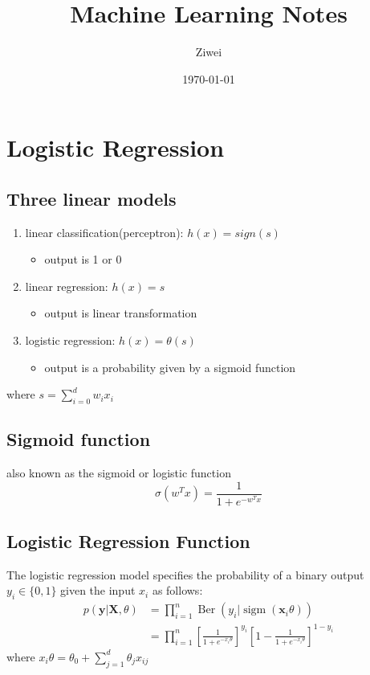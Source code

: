 \documentclass[11pt]{article}
\author{Ziwei}
\date{\today}
\title{Machine Learning Notes}
\begin{document}
\maketitle
\tableofcontents


\section{Logistic Regression}
\label{sec:org920332c}
\subsection{Three linear models}
\label{sec:org347594c}
\begin{enumerate}
\item linear classification(perceptron): \(h(x)=sign(s)\) 
\begin{itemize}
\item output is 1 or 0
\end{itemize}
\item linear regression: \(h(x)=s\) 
\begin{itemize}
\item output is linear transformation
\end{itemize}
\item logistic regression: \(h(x)= \theta(s)\)
\begin{itemize}
\item output is a probability given by a sigmoid function
\end{itemize}
\end{enumerate}
where \(s=\sum_{i=0}^{d}w_{i}x_{i}\) 

\subsection{Sigmoid function}
\label{sec:org3689c99}
also known as the sigmoid or logistic function 
$$
\sigma(w^Tx) = \frac{1}{1+e^{-w^T x}} 
$$

\subsection{Logistic Regression Function}
\label{sec:org81d0854}
The logistic regression model specifies the probability of a binary output \(y_i \in \{0,1\}\) given the input \(x_i\) as follows:
$$
\left.\begin{aligned} p ( \mathbf { y } | \mathbf { X } ,\theta ) & = \prod _ { i = 1} ^ { n } \operatorname{Ber} \left( y _ { i } | \operatorname{sigm} \left( \mathbf { x } _ { i } \theta \right) \right) \\ & = \prod _ { i = 1} ^ { n } \left[ \frac { 1} { 1+ e ^ { - x _ { i } \theta } } \right] ^ { y _ { i } } \left[ 1- \frac { 1} { 1+ e ^ { - x _ { i } \theta } } \right] ^ { 1- y _ { i } } \end{aligned} \right.
$$
where \(x _ { i } \theta = \theta _ { 0} + \sum _ { j = 1} ^ { d } \theta _ { j } x _ { i j }\)
\end{document}
